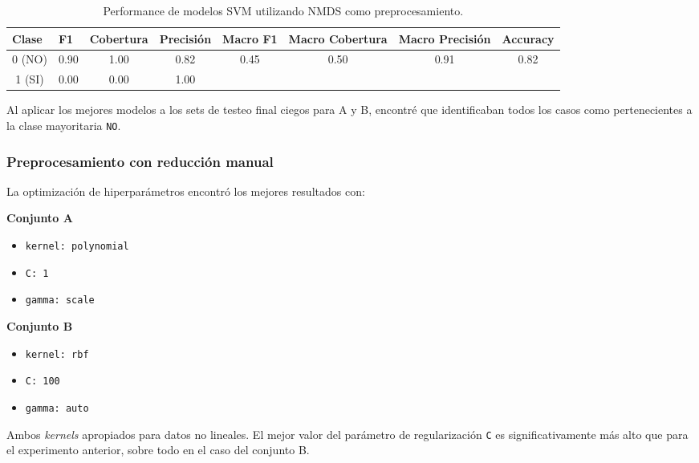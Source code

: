 \documentclass[10 pt]{article}
\begin{document}
\begin{table}[H]
    \centering
    \small
    \caption{Performance de modelos SVM utilizando NMDS como preprocesamiento.}
    \label{svmperfonmds}
    \begin{tabular}{cccccccc}
    \hline
    \multicolumn{1}{l}{\textbf{Clase}} & \multicolumn{1}{l}{\textbf{F1}} & \multicolumn{1}{l}{\textbf{Cobertura}} & \multicolumn{1}{l}{\textbf{Precisión}} & \multicolumn{1}{l}{\textbf{Macro F1}} & \multicolumn{1}{l}{\textbf{Macro Cobertura}} & \multicolumn{1}{l}{\textbf{Macro Precisión}} & \multicolumn{1}{l}{\textbf{Accuracy}} \\ \hline
    0 (NO) & 0.90 & 1.00 & 0.82 & \multirow{2}{*}{0.45} & \multirow{2}{*}{0.50} & \multirow{2}{*}{0.91} & \multirow{2}{*}{0.82} \\
    1 (SI) & 0.00 & 0.00 & 1.00 &  &  &  &  \\ \hline
    \end{tabular}
    \end{table}


Al aplicar los mejores modelos a los sets de testeo final ciegos para A y B, encontré que identificaban todos los casos como pertenecientes a la clase mayoritaria \texttt{NO}.  


\subsubsection{Preprocesamiento con reducción manual}


La optimización de hiperparámetros encontró los mejores resultados con:


\begin{multicols}{2}
\textbf{Conjunto A}
    \begin{itemize}
        \item \texttt{kernel: polynomial}
        \item \texttt{C: 1}
        \item \texttt{gamma: scale}
    \end{itemize}    
    \columnbreak
    \textbf{Conjunto B}
    \begin{itemize}
        \item \texttt{kernel: rbf}
        \item \texttt{C: 100}
        \item \texttt{gamma: auto}
    \end{itemize}
\end{multicols}    


Ambos \textit{kernels} apropiados para datos no lineales. El mejor valor del parámetro de regularización \texttt{C} es significativamente más alto que para el experimento anterior, sobre todo en el caso del conjunto B. 
\end{document}
